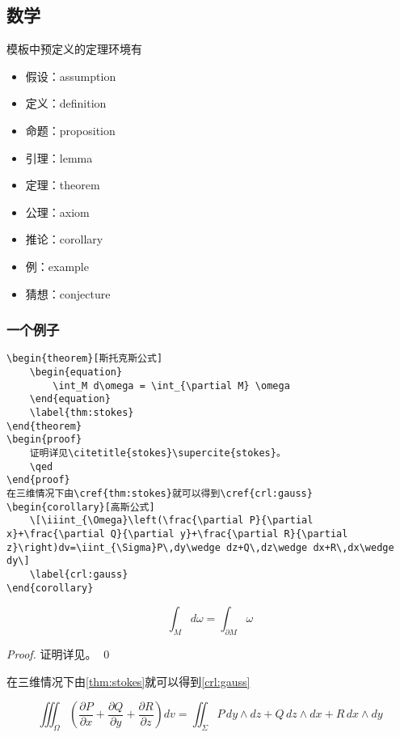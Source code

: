 \documentclass[oneside]{LZU}
\begin{document}
\subsection{数学}
模板中预定义的定理环境有
\begin{itemize}
    \item 假设：assumption
    \item 定义：definition
    \item 命题：proposition
    \item 引理：lemma
    \item 定理：theorem
    \item 公理：axiom
    \item 推论：corollary
    \item 例：example
    \item 猜想：conjecture
\end{itemize}
\subsubsection{一个例子}
\begin{verbatim}
\begin{theorem}[斯托克斯公式]
    \begin{equation}
        \int_M d\omega = \int_{\partial M} \omega
    \end{equation}
    \label{thm:stokes}
\end{theorem}
\begin{proof}
    证明详见\citetitle{stokes}\supercite{stokes}。
    \qed
\end{proof}
在三维情况下由\cref{thm:stokes}就可以得到\cref{crl:gauss}
\begin{corollary}[高斯公式]
    \[\iiint_{\Omega}\left(\frac{\partial P}{\partial x}+\frac{\partial Q}{\partial y}+\frac{\partial R}{\partial z}\right)dv=\iint_{\Sigma}P\,dy\wedge dz+Q\,dz\wedge dx+R\,dx\wedge dy\]
    \label{crl:gauss}
\end{corollary}
\end{verbatim}

\begin{theorem}[斯托克斯公式]
    \begin{equation}
        \int_M d\omega = \int_{\partial M} \omega
    \end{equation}
    \label{thm:stokes}
\end{theorem}
\begin{proof}
    证明详见\supercite{stokes}。
    \qed
\end{proof}
在三维情况下由\cref{thm:stokes}就可以得到\cref{crl:gauss}
\begin{corollary}[高斯公式]
    \[\iiint_{\Omega}\left(\frac{\partial P}{\partial x}+\frac{\partial Q}{\partial y}+\frac{\partial R}{\partial z}\right)dv=\iint_{\Sigma}P\,dy\wedge dz+Q\,dz\wedge dx+R\,dx\wedge dy\]
    \label{crl:gauss}
\end{corollary}
\end{document}
